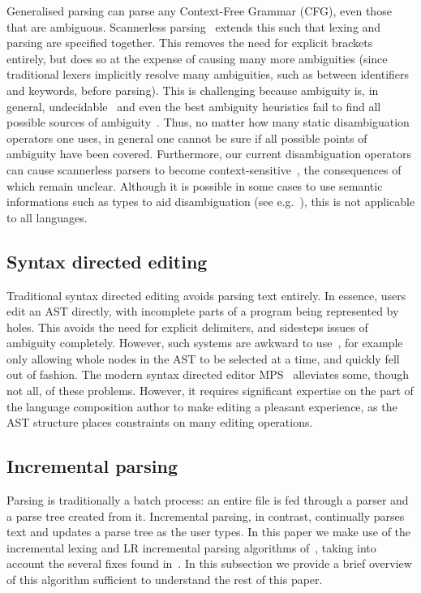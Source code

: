 \documentclass[sigplan,screen]{acmart}\settopmatter{printfolios=true,printccs=false,printacmref=false}
\begin{document}
Generalised parsing can parse any Context-Free Grammar (CFG), even those that
are ambiguous. Scannerless parsing~\cite{visser97scannerless} extends this such
that lexing and parsing are specified together. This removes the need for
explicit brackets entirely, but does so at the expense of causing many more
ambiguities (since traditional lexers implicitly resolve many ambiguities, such
as between identifiers and keywords, before parsing).
This is challenging because ambiguity is, in general,
undecidable~\cite{cantor62ambiguity} and even the best ambiguity heuristics fail
to find all possible sources of ambiguity~\cite{vasudevan13detecting}. Thus,
no matter how many static disambiguation operators one uses, in general one
cannot be sure if all possible points of ambiguity have been covered.
Furthermore, our current disambiguation operators can cause scannerless
parsers to become context-sensitive~\cite{eijck__lets_accept_rejects}, the
consequences of which remain unclear. Although it is possible in some cases
to use semantic informations such as types to aid disambiguation (see
e.g.~\cite{vinju05typedriven}), this is not applicable to all languages.


\subsection{Syntax directed editing}

Traditional syntax directed editing avoids parsing text entirely. In essence,
users edit an AST directly, with incomplete parts of a program being
represented by holes. This avoids the need for explicit delimiters, and
sidesteps issues of ambiguity completely. However, such systems are awkward to
use~\cite[p.~2]{khwaja93syntax}, for example only allowing whole nodes in the AST to be selected at a time,
and quickly fell out of fashion. The modern syntax directed editor
MPS~\cite{pech13mps} alleviates some, though not all, of these problems.
However, it requires significant expertise on the part of the language composition
author to make editing a pleasant experience, as the AST structure places
constraints on many editing operations.


\subsection{Incremental parsing}

Parsing is traditionally a batch process: an entire file is fed through a parser
and a parse tree created from it. Incremental parsing, in contrast,
continually parses text and updates a parse tree as the user types.
In this paper we make use of the incremental lexing and
LR incremental parsing algorithms of~\citet{wagner98practicalalgorithms},
taking into account the several fixes found in~\cite{diekmann18editing}.
In this subsection we provide a brief overview of this algorithm sufficient
to understand the rest of this paper.
\end{document}
